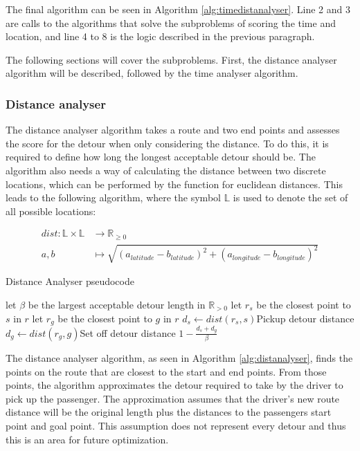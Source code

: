 The final algorithm can be seen in Algorithm \ref{alg:timedistanalyser}.
Line 2 and 3 are calls to the algorithms that solve the subproblems of scoring the time and location, and line 4 to 8 is the logic described in the previous paragraph.

The following sections will cover the subproblems.
First, the distance analyser algorithm will be described, followed by the time analyser algorithm.

\subsubsection{Distance analyser}
The distance analyser algorithm takes a route and two end points and assesses the score for the detour when only considering the distance.
To do this, it is required to define how long the longest acceptable detour should be.
The algorithm also needs a way of calculating the distance between two discrete locations, which can be performed by the function for euclidean distances.
This leads to the following algorithm, where the symbol $\mathbb{L}$ is used to denote the set of all possible locations:

\begin{align*}
	dist : \mathbb{L}\times\mathbb{L} &\rightarrow \mathbb{R}_{\geq 0}\\
	a, b &\mapsto \sqrt{(a_{latitude} - b_{latitude})^2 + (a_{longitude} - b_{longitude})^2}
\end{align*}

\begin{algorithm}
	\caption{Distance Analyser pseudocode}
	\label{alg:distanalyser}
	\begin{algorithmic}[1]
		\Require 
		\Statex let $\beta$ be the largest acceptable detour length in $\mathbb{R}_{>0}$ 
		\Statex 
			\State let $r_s$ be the closest point to $s$ in $r$
			\State let $r_g$ be the closest point to $g$ in $r$
			\State $d_s\gets dist(r_s, s)$\Comment Pickup detour distance
			\State $d_g\gets dist(r_g, g)$\Comment Set off detour distance
			\State\Return $1-\frac{d_s + d_g}{\beta}$
		\EndFunction
	\end{algorithmic}
\end{algorithm}

The distance analyser algorithm, as seen in Algorithm \ref{alg:distanalyser}, finds the points on the route that are closest to the start and end points.
From those points, the algorithm approximates the detour required to take by the driver to pick up the passenger.
The approximation assumes that the driver's new route distance will be the original length plus the distances to the passengers start point and goal point.
This assumption does not represent every detour and thus this is an area for future optimization.


